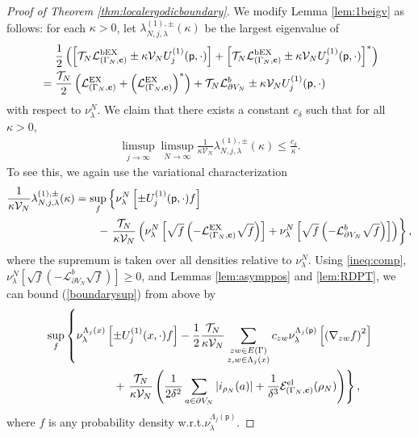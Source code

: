 \documentclass[11pt]{amsart}
\theoremstyle{plain}
\theoremstyle{definition}
\theoremstyle{remark}
\begin{document}
\begin{proof}[Proof of Theorem \ref{thm:localergodicboundary}]
We modify Lemma \ref{lem:1beigv} as follows: for each $\kappa>0$, let $\lambda^{(1),\pm}_{N,j,\lambda}(\kappa)$ be the largest eigenvalue of 
\begin{align*}
&~\quad\frac{1}{2} \left( \left[\mathcal{T}_N \mathcal{L}^{\rm bEX}_{(\Gamma_N,{\bf c})} \pm \kappa \mathcal{V}_N {U^{(1)}_{{{j}}}}({\mathsf{p}},\cdot)\right] + \left[\mathcal{T}_N \mathcal{L}^{\rm bEX}_{(\Gamma_N,{\bf c})} \pm \kappa \mathcal{V}_N {U^{(1)}_{{{j}}}}({\mathsf{p}},\cdot)\right]^* \right) \\
\nonumber &= \frac{\mathcal{T}_N}{2} \left( \mathcal{L}^{\rm EX}_{(\Gamma_N,{\bf c})} + \left( \mathcal{L}^{\rm EX}_{(\Gamma_N,{\bf c})}\right)^*\right) + \mathcal{T}_N \mathcal{L}^b_{\partial V_N} \pm \kappa \mathcal{V}_N {U^{(1)}_{{{j}}}}({\mathsf{p}},\cdot)
\end{align*}
 with respect to $\nu^N_\lambda$. 
 We claim that there exists a constant $c_\delta$ such that for all $\kappa>0$,
 \begin{align}
 \label{1beigv2}
 \limsup_{j\to\infty} \limsup_{N\to\infty}\frac{1}{\kappa \mathcal{V}_N} \lambda^{(1),\pm}_{N,j,\lambda}(\kappa) \leq \frac{c_\delta}{\kappa}.
 \end{align}
To see this, we again use the variational characterization
\begin{align}
\label{boundarysup}
\frac{1}{\kappa \mathcal{V}_N} \lambda^{(1),\pm}_{N,j,\lambda}(\kappa)&=\sup_f \left\{ \nu^N_\lambda\left[\pm {U^{(1)}_{{{j}}}}({\mathsf{p}},\cdot)f\right]\right.\\
\nonumber & \qquad - \left.\frac{\mathcal{T}_N}{\kappa\mathcal{V}_N} \left(\nu^N_\lambda\left[\sqrt{f} \left(-\mathcal{L}^{\rm EX}_{(\Gamma_N,{\bf c})} \sqrt{f}\right) \right] + \nu_\lambda^N \left[ \sqrt{f} \left(-\mathcal{L}^b_{\partial V_N} \sqrt{f}\right)\right]\right) \right\},
\end{align}
where the supremum is taken over all densities relative to $\nu^N_\lambda$. 
Using \eqref{ineq:comp}, $\nu_\lambda^N \left[ \sqrt{f} \left(-\mathcal{L}^b_{\partial V_N} \sqrt{f}\right)\right]\geq 0$, and Lemmas \ref{lem:asymppos} and \ref{lem:RDPT}, we can bound (\ref{boundarysup}) from above by
\begin{align}
\label{b1b}
&\sup_f \left\{\nu^{\Lambda_j(x)}_\lambda\left[\pm {U^{(1)}_{{{j}}}}(x,\cdot)f\right] -  \frac{1}{2}\frac{\mathcal{T}_N}{\kappa \mathcal{V}_N} \sum_{\substack{zw\in E(\Gamma)\\ z,w\in \Lambda_j(x)}} c_{zw} \nu^{\Lambda_j({\mathsf{p}})}_\lambda\left[\left(\nabla_{zw} f\right)^2\right]\right.\\
\nonumber & \qquad \qquad \qquad +\left.\frac{\mathcal{T}_N}{\kappa\mathcal{V}_N} \left(\frac{1}{2\delta^2} \sum_{a\in \partial V_N} |i_{\rho_N}(a)| + \frac{1}{\delta^3} \mathcal{E}^{\rm el}_{(\Gamma_N,{\bf c})}(\rho_N) \right)\right\},
\end{align}
where $f$ is any probability density w.r.t.\@ $\nu^{\Lambda_j({\mathsf{p}})}_\lambda$.


\end{proof}
\end{document}
